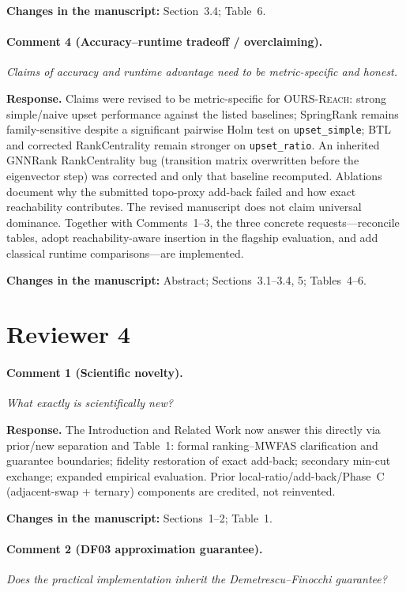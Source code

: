 \documentclass[11pt]{article}
\newcommand{\commentbox}[1]{\par\textit{#1}\par\medskip}
\newcommand{\changes}[1]{\textbf{Changes in the manuscript:} #1\par\medskip}
\begin{document}
\changes{Section~3.4; Table~6.}

\paragraph{Comment 4 (Accuracy--runtime tradeoff / overclaiming).}
\commentbox{Claims of accuracy and runtime advantage need to be metric-specific and honest.}

\noindent\textbf{Response.}
Claims were revised to be metric-specific for \textsc{OURS-Reach}: strong simple/naive upset performance against the listed baselines; SpringRank remains family-sensitive despite a significant pairwise Holm test on \texttt{upset\_simple}; BTL and corrected RankCentrality remain stronger on \texttt{upset\_ratio}. An inherited GNNRank RankCentrality bug (transition matrix overwritten before the eigenvector step) was corrected and only that baseline recomputed. Ablations document why the submitted topo-proxy add-back failed and how exact reachability contributes. The revised manuscript does not claim universal dominance. Together with Comments~1--3, the three concrete requests---reconcile tables, adopt reachability-aware insertion in the flagship evaluation, and add classical runtime comparisons---are implemented.

\changes{Abstract; Sections~3.1--3.4, 5; Tables~4--6.}

\section*{Reviewer 4}

\paragraph{Comment 1 (Scientific novelty).}
\commentbox{What exactly is scientifically new?}

\noindent\textbf{Response.}
The Introduction and Related Work now answer this directly via prior/new separation and Table~1: formal ranking--MWFAS clarification and guarantee boundaries; fidelity restoration of exact add-back; secondary min-cut exchange; expanded empirical evaluation. Prior local-ratio/add-back/Phase~C (adjacent-swap + ternary) components are credited, not reinvented.

\changes{Sections~1--2; Table~1.}

\paragraph{Comment 2 (DF03 approximation guarantee).}
\commentbox{Does the practical implementation inherit the Demetrescu--Finocchi guarantee?}
\end{document}
